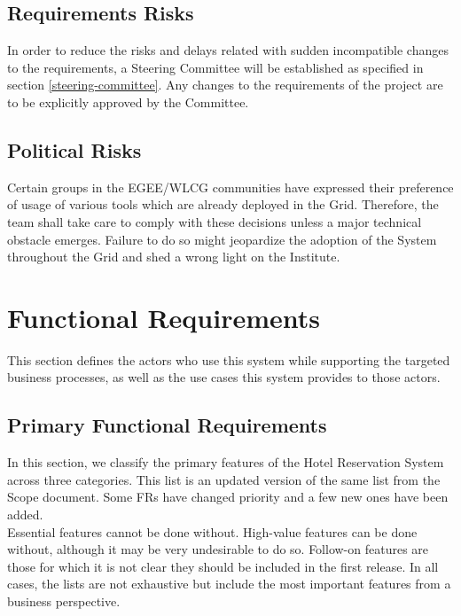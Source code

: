 \documentclass[12pt]{article}
\begin{document}
\subsection{Requirements Risks}
In order to reduce the risks and delays related with sudden incompatible changes
to the requirements, a Steering Committee will be established as specified in
section \ref{steering-committee}.  Any changes to the requirements of the
project are to be explicitly approved by the Committee.

\subsection{Political Risks}
Certain groups in the EGEE/WLCG communities have expressed their preference of
usage of various tools which are already deployed in the Grid.  Therefore, the
team shall take care to comply with these decisions unless a major technical
obstacle emerges.  Failure to do so might jeopardize the adoption of the System
throughout the Grid and shed a wrong light on the Institute.


\section{Functional Requirements}
This section defines the actors who use this system while supporting the targeted business processes, as well as the use cases this 
system provides to those actors.

\subsection{Primary Functional Requirements}
In this section, we classify the primary features of the Hotel Reservation System across three categories. This list is an updated 
version of the same list from the Scope document. Some FRs have changed priority and a few new ones have been added.\\
Essential features cannot be done without. High-value features can be done without, although it may be very undesirable to 
do so. Follow-on features are those for which it is not clear they should be included in the first release. In all cases, 
the lists are not exhaustive but include the most important features from a business perspective.
\end{document}
